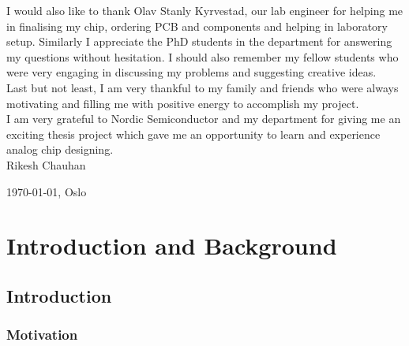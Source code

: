\documentclass[12pt,a4paper,UKenglish]{report}
\makeatletter
\newcommand\mainmatter{%
    \cleardoublepage
  \pagenumbering{arabic}}
\makeatother
\begin{document}
I would also like to thank Olav Stanly Kyrvestad, our lab engineer for helping me in finalising my chip, ordering PCB and components and helping in laboratory  setup. 
Similarly I appreciate the PhD students in the department for answering my questions without hesitation. I should also remember my fellow students who were very engaging in discussing my problems and suggesting creative ideas. \\

Last but not least, I am very thankful to my family and friends who were always motivating and filling me with positive energy to accomplish my project.  \\

I am very grateful to Nordic Semiconductor and my department for giving me an exciting thesis project which gave me an opportunity to learn and experience analog chip designing. \\

Rikesh Chauhan

\today, Oslo

\cleardoublepage
{}
\setcounter{tocdepth}{1}
\tableofcontents{}

\cleardoublepage
{}
{}
\listoffigures{}

\cleardoublepage
{}
{}
\listoftables{}
                  
\mainmatter{}


\part{Introduction and Background}

\chapter{Introduction}

\section{Motivation}
\end{document}

